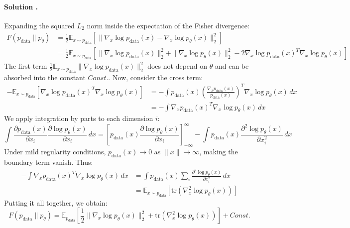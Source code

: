 \documentclass{article}
\newcounter{solutionCount}
\newcommand{\solution}[1]{
    \stepcounter{solutionCount}
    \paragraph{Solution \thesolutionCount.}
    {
        #1
    }
}
\begin{document}
\solution{
    Expanding the squared $L_2$ norm inside the expectation of the Fisher divergence:
    \begin{align*}
        F(p_{\mathrm{data}} \| p_\theta) &= \frac{1}{2} \mathbb{E}_{x \sim p_{\mathrm{data}}} \left[ \|\nabla_x \log p_{\mathrm{data}}(x) - \nabla_x \log p_\theta(x)\|^2_2 \right] \\
        &= \frac{1}{2} \mathbb{E}_{x \sim p_{\mathrm{data}}} \left[ \|\nabla_x \log p_{\mathrm{data}}(x)\|^2_2 + \|\nabla_x \log p_\theta(x)\|^2_2 - 2 \nabla_x \log p_{\mathrm{data}}(x)^T \nabla_x \log p_\theta(x) \right]
    \end{align*}
    The first term $\frac{1}{2} \mathbb{E}_{x \sim p_{\mathrm{data}}} \|\nabla_x \log p_{\mathrm{data}}(x)\|^2_2$ does not depend on $\theta$ and can be absorbed into the constant $Const.$.
    Now, consider the cross term:
    \begin{align*}
        - \mathbb{E}_{x \sim p_{\mathrm{data}}} \left[ \nabla_x \log p_{\mathrm{data}}(x)^T \nabla_x \log p_\theta(x) \right] &= - \int p_{\mathrm{data}}(x) \left( \frac{\nabla_x p_{\mathrm{data}}(x)}{p_{\mathrm{data}}(x)} \right)^T \nabla_x \log p_\theta(x) \, dx \\
        &= - \int \nabla_x p_{\mathrm{data}}(x)^T \nabla_x \log p_\theta(x) \, dx
    \end{align*}
    We apply integration by parts to each dimension $i$:
    \begin{equation*}
        \int \frac{\partial p_{\mathrm{data}}(x)}{\partial x_i} \frac{\partial \log p_\theta(x)}{\partial x_i} \, dx = \left[ p_{\mathrm{data}}(x) \frac{\partial \log p_\theta(x)}{\partial x_i} \right]_{-\infty}^{\infty} - \int p_{\mathrm{data}}(x) \frac{\partial^2 \log p_\theta(x)}{\partial x_i^2} \, dx
    \end{equation*}
    Under mild regularity conditions, $p_{\mathrm{data}}(x) \to 0$ as $\|x\| \to \infty$, making the boundary term vanish. Thus:
    \begin{align*}
        - \int \nabla_x p_{\mathrm{data}}(x)^T \nabla_x \log p_\theta(x) \, dx &= \int p_{\mathrm{data}}(x) \sum_i \frac{\partial^2 \log p_\theta(x)}{\partial x_i^2} \, dx \\
        &= \mathbb{E}_{x \sim p_{\mathrm{data}}} \left[ \mathrm{tr}(\nabla_x^2 \log p_\theta(x)) \right]
    \end{align*}
    Putting it all together, we obtain:
    \begin{equation*}
        F(p_{\mathrm{data}} \| p_\theta) = \mathbb{E}_{p_{\mathrm{data}}} \left[ \frac{1}{2} \|\nabla_x \log p_\theta(x)\|^2_2 + \mathrm{tr}(\nabla_x^2 \log p_\theta(x)) \right] + Const.
    \end{equation*}
}
\end{document}
